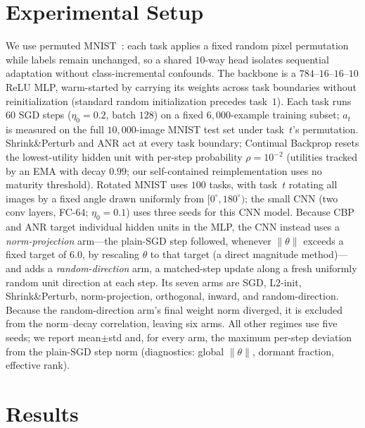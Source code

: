 \documentclass[conference]{IEEEtran}
\begin{document}
\section{Experimental Setup}\label{sec:setup}
{We use permuted MNIST~\cite{goodfellow2013,lecun1998}: each task applies a fixed
random pixel permutation while labels remain unchanged, so a shared $10$-way head isolates
sequential adaptation without class-incremental confounds. The backbone is a
$784$--$16$--$16$--$10$ ReLU MLP, warm-started by carrying its weights across task
boundaries without reinitialization (standard random initialization precedes task~$1$).
Each task runs $60$ SGD steps ($\eta_0{=}0.2$, batch $128$) on a fixed
$6{,}000$-example training subset; $a_t$ is measured on the full $10{,}000$-image MNIST
test set under task~$t$'s permutation. Shrink\&Perturb and ANR act at every task boundary;
Continual Backprop resets the lowest-utility hidden unit with per-step probability
$\rho{=}10^{-2}$ (utilities tracked by an EMA with decay $0.99$; our self-contained
reimplementation uses no maturity threshold). Rotated MNIST uses $100$ tasks, with task~$t$
rotating all images by a fixed angle drawn uniformly from $[0^{\circ},180^{\circ})$;
the small CNN (two conv layers, FC-$64$; $\eta_0{=}0.1$) uses three seeds for this CNN model.
{Because CBP and ANR target individual hidden units in the MLP, the CNN instead uses a
\emph{norm-projection} arm---the plain-SGD step followed, whenever $\lVert\theta\rVert$
exceeds a fixed target of $6.0$, by rescaling $\theta$ to that target (a direct magnitude
method)---and adds a \emph{random-direction} arm, a matched-step update along a fresh
uniformly random unit direction at each step. Its seven arms are SGD, L2-init,
Shrink\&Perturb, norm-projection, orthogonal, inward, and random-direction. Because the
random-direction arm's final weight norm diverged, it is excluded from the norm--decay
correlation, leaving six arms.} All other regimes use five seeds; we report mean$\pm$std and,
for every arm, the maximum per-step deviation from the plain-SGD step norm (diagnostics:
global $\lVert\theta\rVert$, dormant fraction, effective rank).}

\section{Results}\label{sec:results}
\end{document}
